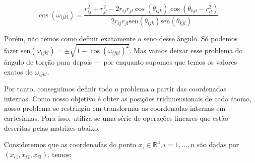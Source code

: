 \documentclass[a4paper,12pt]{article}
\begin{document}
 	\begin{equation}
 	\cos(\omega_{ijkl}) = \frac{r^2_{ij} + r^2_{jl} - 2r_{ij}r_{jl}\cos(\theta_{ijk})\cos(\theta_{kjl}-r^2_{il})}{2r_{ij}r_{jl}\mbox{sen}(\theta_{ijk})\mbox{sen}(\theta_{kjl})}. \label{eq:cosOmega}
 	\end{equation}    
 	
 	Porém, não temos como definir exatamente o seno desse ângulo. Só podemos fazer $\mbox{sen}(\omega_{ijkl}) = \pm\sqrt{1 - \cos(\omega_{ijkl})^2} \label{eq:senOmega}$. Mas vamos deixar esse problema do ângulo de torção para depois --- por enquanto supomos que temos os valores exatos de $\omega_{ijkl}$.
 	
 	Por tanto, conseguimos definir todo o problema a partir das coordenadas internas. Como nosso objetivo é obter as posições tridimensionais de cada átomo, nosso problema se restringiu em transformar as coordenadas internas em cartesianas. Para isso, utiliza-se uma série de operações lineares que estão descritas pelas matrizes abaixo.
 	
 	Consideremos que as coordenadas do ponto $x_{i} \in\mathbb{R}^3,i= 1, ...,n $ são dadas por $(x_{i1},x_{i2},x_{i3})$, temos:
 	
\end{document}

